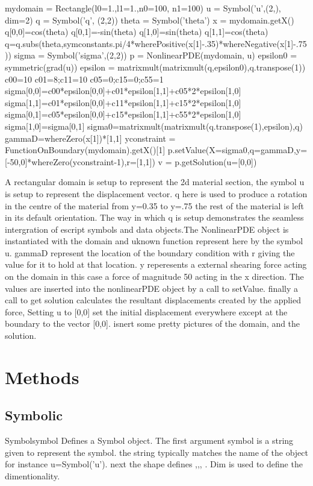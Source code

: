 \begin{python}
mydomain = Rectangle(l0=1.,l1=1.,n0=100, n1=100)
u = Symbol('u',(2,), dim=2)
q = Symbol('q', (2,2))
theta = Symbol('theta')
x = mydomain.getX()
q[0,0]=cos(theta)
q[0,1]=-sin(theta)
q[1,0]=sin(theta)
q[1,1]=cos(theta)
q=q.subs(theta,symconstants.pi/4*wherePositive(x[1]-.35)*whereNegative(x[1]-.75))
sigma = Symbol('sigma',(2,2))
p = NonlinearPDE(mydomain, u)
epsilon0 = symmetric(grad(u))
epsilon = matrixmult(matrixmult(q,epsilon0),q.transpose(1))
c00=10
c01=8;c11=10
c05=0;c15=0;c55=1
sigma[0,0]=c00*epsilon[0,0]+c01*epsilon[1,1]+c05*2*epsilon[1,0]
sigma[1,1]=c01*epsilon[0,0]+c11*epsilon[1,1]+c15*2*epsilon[1,0]
sigma[0,1]=c05*epsilon[0,0]+c15*epsilon[1,1]+c55*2*epsilon[1,0]
sigma[1,0]=sigma[0,1]
sigma0=matrixmult(matrixmult(q.transpose(1),epsilon),q)
gammaD=whereZero(x[1])*[1,1]
yconstraint = FunctionOnBoundary(mydomain).getX()[1]
p.setValue(X=sigma0,q=gammaD,y=[-50,0]*whereZero(yconstraint-1),r=[1,1])
v = p.getSolution(u=[0,0])
\end{python}

A rectangular domain is setup to represent the 2d material section, the symbol u is setup to represent the displacement vector. q here is used to produce a rotation in the centre of the material from y=0.35 to y=.75 the rest of the material is left in its default orientation. The way in which q is setup demonstrates the seamless intergration of escript symbols and data objects.The NonlinearPDE object is instantiated with the domain and uknown function represent here by the symbol u. gammaD represent the location of the boundary condition with r giving the value for it to hold at that location. y reperesents a external shearing force acting on the domain in this case a force of magnitude 50 acting in the x direction. The values are inserted into the nonlinearPDE object by a call to setValue. finally a call to get solution calculates the resultant displacements created by the applied force, Setting u to [0,0] set the initial displacement everywhere except at the boundary to the vector [0,0].
isnert some pretty pictures of the domain, and the solution.


\section{Methods}
\subsection{Symbolic}
\begin{classdesc}{Symbol}{symbol  }
Defines a Symbol object. The first argument symbol is a string given to represent the symbol. the string typically matches the name of the object for instance u=Symbol('u'). next the shape defines ,,, . Dim is used to define the dimentionality.
\end{classdesc}

